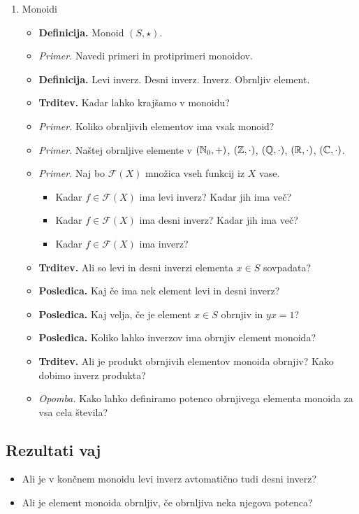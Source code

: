 \begin{enumerate}
    \item Monoidi
    \begin{itemize}
        \item \colorbox{purple!30}{\textbf{Definicija.}} Monoid $(S, \star )$.
        \item \colorbox{yellow!30}{\emph{Primer.}} Navedi primeri in protiprimeri monoidov.
        \item \colorbox{purple!30}{\textbf{Definicija.}} Levi inverz. Desni inverz. Inverz. Obrnljiv element.
        \item \colorbox{blue!30}{\textbf{Trditev.}} Kadar lahko krajšamo v monoidu?
        \item \colorbox{yellow!30}{\emph{Primer.}} Koliko obrnljivih elementov ima vsak monoid?
        \item \colorbox{yellow!30}{\emph{Primer.}} Naštej obrnljive elemente v $(\mathbb{N}_0, +)$, $(\mathbb{Z}, \cdot)$, $(\mathbb{Q}, \cdot)$, $(\mathbb{R}, \cdot)$, $(\mathbb{C}, \cdot)$.
        \item \colorbox{yellow!30}{\emph{Primer.}} Naj bo $\mathcal{F}(X)$ množica vseh funkcij iz $X$ vase.
        \begin{itemize}
            \item Kadar $f \in \mathcal{F}(X)$ ima levi inverz? Kadar jih ima več?
            \item Kadar $f \in \mathcal{F}(X)$ ima desni inverz? Kadar jih ima več? 
            \item Kadar $f \in \mathcal{F}(X)$ ima inverz?
        \end{itemize}
        \item \colorbox{blue!30}{\textbf{Trditev.}} Ali so levi in desni inverzi elementa $x \in S$ sovpadata?
        \item \colorbox{orange!30}{\textbf{Posledica.}} Kaj če ima nek element levi in desni inverz?
        \item \colorbox{orange!30}{\textbf{Posledica.}} Kaj velja, če je element $x \in S$ obrnjiv in $yx = 1$?
        \item \colorbox{orange!30}{\textbf{Posledica.}} Koliko lahko inverzov ima obrnjiv element monoida? 
        \item \colorbox{blue!30}{\textbf{Trditev.}} Ali je produkt obrnjivih elementov monoida obrnjiv? Kako dobimo inverz produkta?
        \item \colorbox{yellow!30}{\emph{Opomba.}} Kako lahko definiramo potenco obrnjivega elementa monoida za vsa cela števila? 
    \end{itemize}
\end{enumerate}

\subsection*{Rezultati vaj}
\begin{itemize}
    \item Ali je v končnem monoidu levi inverz avtomatično tudi desni inverz?
    \item Ali je element monoida obrnljiv, če obrnljiva neka njegova potenca?
\end{itemize}
